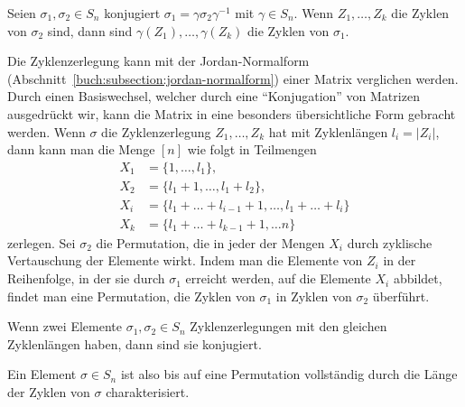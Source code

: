 \begin{satz}
Seien $\sigma_1,\sigma_2\in S_n$ konjugiert $\sigma_1=\gamma\sigma_2\gamma^{-1}$
mit $\gamma\in S_n$.
Wenn $Z_1,\dots,Z_k$ die Zyklen von $\sigma_2$ sind, dann sind 
$\gamma(Z_1),\dots,\gamma(Z_k)$ die Zyklen von $\sigma_1$.
\end{satz}

Die Zyklenzerlegung kann mit der Jordan-Normalform
%
(Abschnitt~\ref{buch:subsection:jordan-normalform})
einer Matrix verglichen werden.
Durch einen Basiswechsel, welcher durch eine ``Konjugation''
%
von Matrizen ausgedrückt wir, kann die Matrix in eine besonders 
übersichtliche Form gebracht werden.
Wenn $\sigma$ die Zyklenzerlegung $Z_1,\dots,Z_k$ hat mit Zyklenlängen
$l_i=|Z_i|$, dann kann man die Menge $[n]$ wie folgt in Teilmengen
\begin{align*}
X_1 &= \{1,\dots, l_1\},
\\
X_2 &= \{l_1+1,\dots,l_1+l_2\},
\\
X_i &= \{l_1+\dots+l_{i-1}+1,\dots, l_1+\dots+l_i\}
\\
X_k &= \{l_1+\dots+l_{k-1}+1,\dots n\}
\end{align*}
zerlegen.
Sei $\sigma_2$ die Permutation, die in jeder der Mengen $X_i$ durch
zyklische Vertauschung der Elemente wirkt.
Indem man die Elemente von $Z_i$ in der Reihenfolge, in der sie durch
$\sigma_1$ erreicht werden, auf die Elemente $X_i$ abbildet, findet
man eine Permutation, die Zyklen von $\sigma_1$ in Zyklen von $\sigma_2$
überführt.

\begin{satz}
Wenn zwei Elemente $\sigma_1,\sigma_2\in S_n$ Zyklenzerlegungen mit den
gleichen Zyklenlängen haben, dann sind sie konjugiert.
\end{satz}

Ein Element $\sigma\in S_n$ ist also bis auf eine Permutation
vollständig durch die Länge der Zyklen von $\sigma$ charakterisiert.


